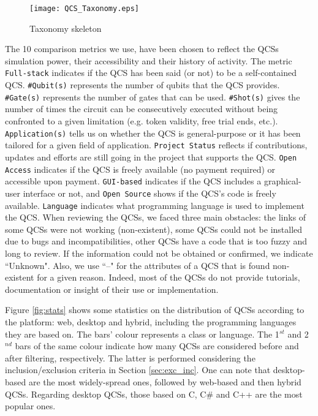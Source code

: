 \documentclass[conference]{IEEEtran}
\begin{document}
\vspace{-.5em}
\begin{figure}[h!]\centering
	\texttt{[image: QCS\_Taxonomy.eps]}
	\caption{Taxonomy skeleton \label{fig:mathod}}
\end{figure}
\vspace{-.5em}

The 10 comparison metrics we use, have been chosen to reflect the QCSs simulation power, their accessibility and their history of activity. The metric \texttt{Full-stack} indicates if the QCS has been said (or not) to be a self-contained QCS. \texttt{\#Qubit(s)} represents the number of qubits that the QCS provides. \texttt{\#Gate(s)} represents the number of gates that can be used. \texttt{\#Shot(s)} gives the number of times the circuit can be consecutively executed without being confronted to a given limitation (e.g. token validity, free trial ends, etc.). \texttt{Application(s)} tells us on whether the QCS is general-purpose or it has been tailored for a given field of application. \texttt{Project Status} reflects if contributions, updates and efforts are still going in the project that supports the QCS. \texttt{Open Access} indicates if the QCS is freely available (no payment required) or accessible upon payment. \texttt{GUI-based} indicates if the QCS includes a graphical-user interface or not, and \texttt{Open Source} shows if the QCS's code is freely available. \texttt{Language} indicates what programming language is used to implement the QCS. When reviewing the QCSs, we faced three main obstacles: the links of some QCSs were not working (non-existent), some QCSs could not be installed due to bugs and incompatibilities, other QCSs have a code that is too fuzzy and long to review. If the information could not be obtained or confirmed, we indicate ``Unknown". Also, we use ``--" for the attributes of a QCS that is found non-existent for a given reason. Indeed, most of the QCSs do not provide tutorials, documentation or insight of their use or implementation.


Figure \ref{fig:stats} shows some statistics on the distribution of QCSs according to the platform: web, desktop and hybrid, including the programming languages they are based on. The bars' colour represents a class or language. The 1$^{st}$ and 2$^{nd}$ bars of the same colour indicate how many QCSs are considered before and after filtering, respectively. The latter is performed considering the inclusion/exclusion criteria in Section \ref{sec:exc_inc}. One can note that desktop-based are the most widely-spread ones, followed by web-based and then hybrid QCSs. Regarding desktop QCSs, those based on C, C\# and C++ are the most popular ones. 
\end{document}
